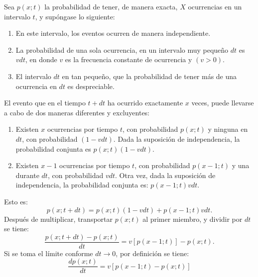 Sea $p(x;t)$ la probabilidad de tener, de manera exacta, $X$ ocurrencias en un intervalo $t$, y supóngase lo siguiente:

\begin{enumerate}[\bfseries 1.]
    \item En este intervalo, los eventos ocurren de manera independiente.
    \item La probabilidad de una sola ocurrencia, en un intervalo muy pequeño $dt$ es $vdt$, en donde $v$ es la frecuencia constante de ocurrencia y $(v>0)$.
    \item El intervalo $dt$ en tan pequeño, que la probabilidad de tener más de una ocurrencia en $dt$ es despreciable.
\end{enumerate}

El evento que en el tiempo $t+dt$ ha ocurrido exactamente $x$ veces, puede llevarse a cabo de dos maneras diferentes y excluyentes:

\begin{enumerate}[\bfseries 1.]
    \item Existen $x$ ocurrencias por tiempo $t$, con probabilidad $p(x;t)$ y ninguna en $dt$, con probabilidad $(1-vdt)$. Dada la suposición de independencia, la probabilidad conjunta es $p(x;t)(1-vdt)$.
    \item Existen $x-1$ ocurrencias por tiempo $t$, con probabilidad $p(x-1;t)$ y una durante $dt$, con probabilidad $vdt$. Otra vez, dada la suposición de independencia, la probabilidad conjunta es: $p(x-1;t)vdt.$ 
\end{enumerate}
Esto es:
$$p(x;t+dt)=p(x;t)(1-vdt)+p(x-1;t)vdt.$$
Después de multiplicar, transportar $p(x;t)$ al primer miembro, y dividir por $dt$ se tiene:
$$\dfrac{p(x;t+dt)-p(x;t)}{dt}=v[p(x-1;t)]-p(x;t).$$
Si se toma el límite conforme $dt\to 0$, por definición se tiene:
$$\dfrac{dp(x;t)}{dt}=v[p(x-1;t)-p(x;t)]$$

